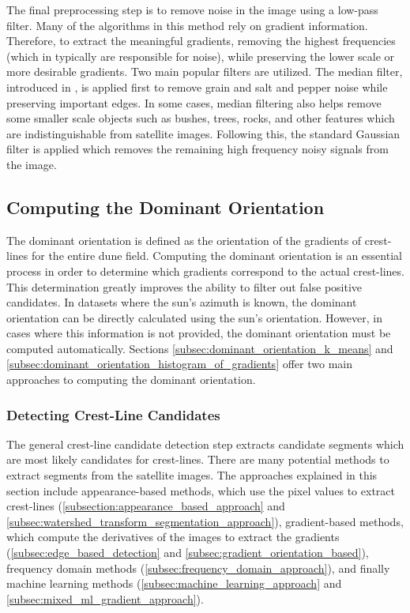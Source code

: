 The final preprocessing step is to remove noise in the image using a low-pass filter. Many of the algorithms in this method rely on gradient information. Therefore, to extract the meaningful gradients, removing the highest frequencies (which in typically are responsible for noise), while preserving the lower scale or more desirable gradients. Two main popular filters are utilized. The median filter, introduced in \cite{huang_median_filtering_algorithm}, is applied first to remove grain and salt and pepper noise while preserving important edges. In some cases, median filtering also helps remove some smaller scale objects such as bushes, trees, rocks, and other features which are indistinguishable from satellite images. Following this, the standard Gaussian filter is applied which removes the remaining high frequency noisy signals from the image.

\subsection{Computing the Dominant Orientation} 
The dominant orientation is defined as the orientation of the gradients of crest-lines for the entire dune field. Computing the dominant orientation is an essential process in order to determine which gradients correspond to the actual crest-lines. This determination greatly improves the ability to filter out false positive candidates. In datasets where the sun's azimuth is known, the dominant orientation can be directly calculated using the sun's orientation. However, in cases where this information is not provided, the dominant orientation must be computed automatically. Sections \ref{subsec:dominant_orientation_k_means} and \ref{subsec:dominant_orientation_histogram_of_gradients} offer two main approaches to computing the dominant orientation.

\subsubsection*{Detecting Crest-Line Candidates}
The general crest-line candidate detection step extracts candidate segments which are most likely candidates for crest-lines. There are many potential methods to extract segments from the satellite images. The approaches explained in this section include appearance-based methods, which use the pixel values to extract crest-lines (\ref{subsection:appearance_based_approach} and \ref{subsec:watershed_transform_segmentation_approach}), gradient-based methods, which compute the derivatives of the images to extract the gradients (\ref{subsec:edge_based_detection} and \ref{subsec:gradient_orientation_based}), frequency domain methods (\ref{subsec:frequency_domain_approach}), and finally machine learning methods (\ref{subsec:machine_learning_approach} and \ref{subsec:mixed_ml_gradient_approach}). 

